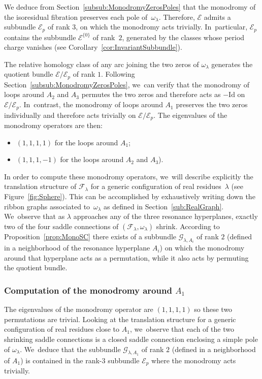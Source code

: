 \documentclass[JEP,XML,SOM,Unicode,NoFloatCountersInSection,published]{cedram}
\newcommand{\Id}{{\mathrm{Id}}}
\theoremstyle{definition}
\begin{document}
We deduce from Section~\ref{subsub:MonodromyZerosPoles} that the monodromy of the isoresidual fibration preserves each pole of~$\omega_{\lambda}$. Therefore, $\mathcal{E}$ admits a subbundle $\mathcal{E}_{p}$ of rank $3$, on which the monodromy acts trivially. In~particular, $\mathcal{E}_{p}$ contains the subbundle $\mathcal{E}^{\lbrace{ 0 \rbrace}}$ of rank~$2$, generated by the classes whose period charge vanishes (see Corollary~\ref{cor:InvariantSubbundle}).

The relative homology class of any arc joining the two zeros of $\omega_{\lambda}$ generates the quotient bundle $\mathcal{E}/\mathcal{E}_{p}$ of rank $1$. Following Section~\ref{subsub:MonodromyZerosPoles}, we~can verify that the monodromy of loops around $A_{2}$ and $A_{3}$ permutes the two zeros and therefore acts as $-\Id$ on $\mathcal{E}/\mathcal{E}_{p}$. In~contrast, the monodromy of loops around $A_{1}$ preserves the two zeros individually and therefore acts trivially on $\mathcal{E}/\mathcal{E}_{p}$. The eigenvalues of the monodromy operators are then:
\begin{itemize}
\item $(1,1,1,1)$ for the loops around $A_{1}$;
\item $(1,1,1,-1)$ for the loops around $A_{2}$ and $A_{3}$).
\end{itemize}
In order to compute these monodromy operators, we~will describe explicitly the translation structure of $\mathcal{F}_{\lambda}$ for a generic configuration of real residues~$\lambda$ (see Figure~\ref{fig:Sphere}). This can be accomplished by exhaustively writing down the ribbon graphs associated to~$\omega_\lambda$ as defined in Section~\ref{sub:RealGraph}. We~observe that as $\lambda$ approaches any of the three resonance hyperplanes, exactly two of the four saddle connections of $(\mathcal{F}_{\lambda},\omega_{\lambda})$ shrink. According to Proposition~\ref{prop:MonoSC} there exists of a subbundle $\mathcal{G}_{\lambda,A_{i}}$ of rank $2$ (defined in a neighborhood of the resonance hyperplane $A_{i}$) on which the monodromy around that hyperplane acts as a permutation, while it also acts by permuting the quotient bundle.

\subsubsection{Computation of the monodromy around $A_{1}$}

The eigenvalues of the monodromy operator are $(1,1,1,1)$ so these two permutations are trivial. Looking at the translation structure for a generic configuration of real residues close to $A_{1}$, we~observe that each of the two shrinking saddle connections is a closed saddle connection enclosing a simple pole of $\omega_{\lambda}$. We~deduce that the subbundle $\mathcal{G}_{\lambda,A_{1}}$ of rank $2$ (defined in a neighborhood of $A_{1}$) is contained in the rank-$3$ subbundle $\mathcal{E}_{p}$ where the monodromy acts trivially.
\end{document}
